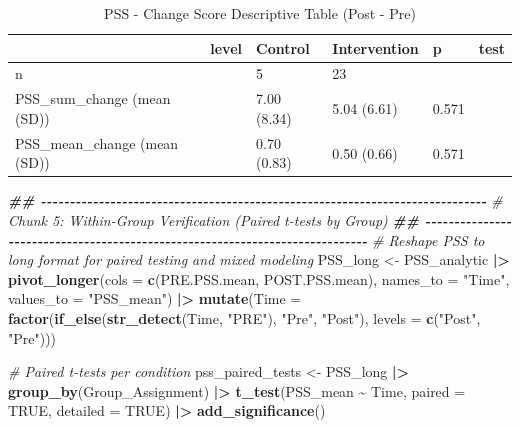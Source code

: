 \documentclass[
]{article}
\newenvironment{Shaded}{\begin{snugshade}}{\end{snugshade}}
\newcommand{\AttributeTok}[1]{\textcolor[rgb]{0.13,0.29,0.53}{#1}}
\newcommand{\CommentTok}[1]{\textcolor[rgb]{0.56,0.35,0.01}{\textit{#1}}}
\newcommand{\ConstantTok}[1]{\textcolor[rgb]{0.56,0.35,0.01}{#1}}
\newcommand{\DocumentationTok}[1]{\textcolor[rgb]{0.56,0.35,0.01}{\textbf{\textit{#1}}}}
\newcommand{\FunctionTok}[1]{\textcolor[rgb]{0.13,0.29,0.53}{\textbf{#1}}}
\newcommand{\NormalTok}[1]{#1}
\newcommand{\OtherTok}[1]{\textcolor[rgb]{0.56,0.35,0.01}{#1}}
\newcommand{\SpecialCharTok}[1]{\textcolor[rgb]{0.81,0.36,0.00}{\textbf{#1}}}
\newcommand{\StringTok}[1]{\textcolor[rgb]{0.31,0.60,0.02}{#1}}
\begin{document}
\begin{longtable}[t]{llllll}
\caption{\label{tab:unnamed-chunk-7}PSS - Change Score Descriptive Table (Post - Pre)}\\
\toprule
 & level & Control & Intervention & p & test\\
\midrule
n &  & 5 & 23 &  & \\
PSS\_sum\_change (mean (SD)) &  & 7.00 (8.34) & 5.04 (6.61) & 0.571 & \\
PSS\_mean\_change (mean (SD)) &  & 0.70 (0.83) & 0.50 (0.66) & 0.571 & \\
\bottomrule
\end{longtable}

\begin{Shaded}
\begin{Highlighting}[]
\DocumentationTok{\#\# {-}{-}{-}{-}{-}{-}{-}{-}{-}{-}{-}{-}{-}{-}{-}{-}{-}{-}{-}{-}{-}{-}{-}{-}{-}{-}{-}{-}{-}{-}{-}{-}{-}{-}{-}{-}{-}{-}{-}{-}{-}{-}{-}{-}{-}{-}{-}{-}{-}{-}{-}{-}{-}{-}{-}{-}{-}{-}{-}{-}{-}{-}{-}{-}{-}{-}{-}{-}{-}{-}{-}{-}{-}{-}{-}{-}{-}}
\CommentTok{\# Chunk 5: Within{-}Group Verification (Paired t{-}tests by Group)}
\DocumentationTok{\#\# {-}{-}{-}{-}{-}{-}{-}{-}{-}{-}{-}{-}{-}{-}{-}{-}{-}{-}{-}{-}{-}{-}{-}{-}{-}{-}{-}{-}{-}{-}{-}{-}{-}{-}{-}{-}{-}{-}{-}{-}{-}{-}{-}{-}{-}{-}{-}{-}{-}{-}{-}{-}{-}{-}{-}{-}{-}{-}{-}{-}{-}{-}{-}{-}{-}{-}{-}{-}{-}{-}{-}{-}{-}{-}{-}{-}{-}}
\CommentTok{\# Reshape PSS to long format for paired testing and mixed modeling}
\NormalTok{PSS\_long }\OtherTok{\textless{}{-}}\NormalTok{ PSS\_analytic }\SpecialCharTok{|\textgreater{}} 
  \FunctionTok{pivot\_longer}\NormalTok{(}\AttributeTok{cols =} \FunctionTok{c}\NormalTok{(PRE.PSS.mean, POST.PSS.mean), }\AttributeTok{names\_to =} \StringTok{"Time"}\NormalTok{, }\AttributeTok{values\_to =} \StringTok{"PSS\_mean"}\NormalTok{) }\SpecialCharTok{|\textgreater{}} 
  \FunctionTok{mutate}\NormalTok{(}\AttributeTok{Time =} \FunctionTok{factor}\NormalTok{(}\FunctionTok{if\_else}\NormalTok{(}\FunctionTok{str\_detect}\NormalTok{(Time, }\StringTok{"PRE"}\NormalTok{), }\StringTok{"Pre"}\NormalTok{, }\StringTok{"Post"}\NormalTok{), }\AttributeTok{levels =} \FunctionTok{c}\NormalTok{(}\StringTok{"Post"}\NormalTok{, }\StringTok{"Pre"}\NormalTok{)))}

\CommentTok{\# Paired t{-}tests per condition}
\NormalTok{pss\_paired\_tests }\OtherTok{\textless{}{-}}\NormalTok{ PSS\_long }\SpecialCharTok{|\textgreater{}} 
  \FunctionTok{group\_by}\NormalTok{(Group\_Assignment) }\SpecialCharTok{|\textgreater{}} 
  \FunctionTok{t\_test}\NormalTok{(PSS\_mean }\SpecialCharTok{\textasciitilde{}}\NormalTok{ Time, }\AttributeTok{paired =} \ConstantTok{TRUE}\NormalTok{, }\AttributeTok{detailed =} \ConstantTok{TRUE}\NormalTok{) }\SpecialCharTok{|\textgreater{}} 
  \FunctionTok{add\_significance}\NormalTok{()}


\end{Highlighting}
\end{Shaded}
\end{document}
